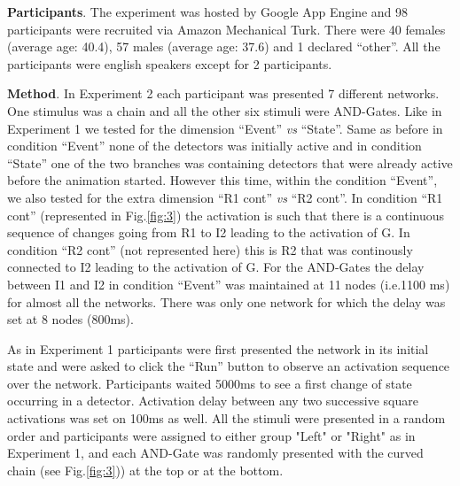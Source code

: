 \documentclass[10pt,letterpaper]{article}
\begin{document}
\textbf{Participants}. The experiment was hosted by Google App Engine and 98 participants were recruited via Amazon Mechanical Turk. There were 40 females (average age: 40.4), 57 males (average age: 37.6) and 1 declared ``other''. All the participants were english speakers except for 2 participants.

\textbf{Method}. In Experiment 2 each participant was presented 7 different networks. One stimulus was a chain and all the other six stimuli were AND-Gates. Like in Experiment 1 we tested for the dimension ``Event'' \textit{vs} ``State''. Same as before in condition ``Event'' none of the detectors was initially active and in condition ``State'' one of the two branches was containing detectors that were already active before the animation started. However this time, within the condition ``Event'',  we also tested for the extra dimension ``R1 cont'' \textit{vs} ``R2 cont''.  In condition ``R1 cont'' (represented in Fig.\ref{fig:3}) the activation is such that there is a continuous sequence of changes going from R1 to I2 leading to the activation of G. In condition ``R2 cont'' (not represented here) this is R2 that was continously connected to I2 leading to the activation of G. For the AND-Gates the delay between I1 and I2 in condition ``Event'' was maintained at 11 nodes (i.e.1100 ms) for almost all the networks. There was only one network for which the delay was set at 8 nodes (800ms).

As in Experiment 1 participants were first presented the network in its initial state and were asked to click the ``Run'' button to observe an activation sequence over the network. Participants waited 5000ms to see a first change of state occurring in a detector. Activation delay between any two successive square activations was set on 100ms as well. All the stimuli were presented in a random order and participants were assigned to either group "Left" or "Right" as in Experiment 1, and each AND-Gate was randomly presented with the curved chain (see Fig.\ref{fig:3})) at the top or at the bottom.

\end{document}
